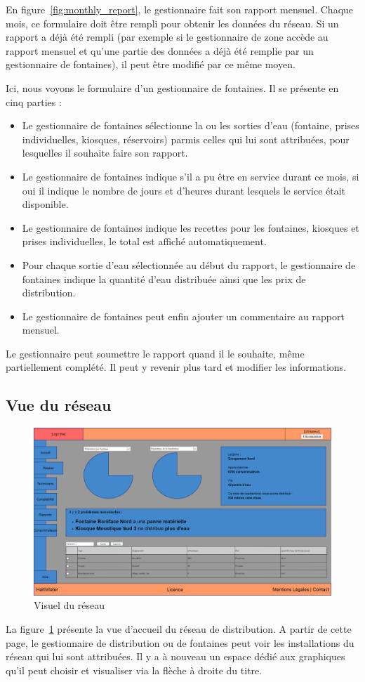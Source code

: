 \documentclass[a4paper, 11pt]{article}
\begin{document}
    En figure~\ref{fig:monthly_report}, le gestionnaire fait son rapport mensuel. Chaque mois, ce formulaire doit être rempli pour obtenir les données du réseau. Si un rapport a déjà été rempli (par exemple si le gestionnaire de zone accède au rapport mensuel et qu'une partie des données a déjà été remplie par un gestionnaire de fontaines), il peut être modifié par ce même moyen.

    Ici, nous voyons le formulaire d'un gestionnaire de fontaines. Il se présente en cinq parties :
    \begin{itemize}
      \item Le gestionnaire de fontaines sélectionne la ou les sorties d'eau (fontaine, prises individuelles, kiosques, réservoirs) parmis celles qui lui sont attribuées, pour lesquelles il souhaite faire son rapport.
      \item Le gestionnaire de fontaines indique s'il a pu être en service durant ce mois, si oui il indique le nombre de jours et d'heures durant lesquels le service était disponible.
      \item Le gestionnaire de fontaines indique les recettes pour les fontaines, kiosques et prises individuelles, le total est affiché automatiquement.
      \item Pour chaque sortie d'eau sélectionnée au début du rapport, le gestionnaire de fontaines indique la quantité d'eau distribuée ainsi que les prix de distribution.
      \item Le gestionnaire de fontaines peut enfin ajouter un commentaire au rapport mensuel.
    \end{itemize}

    Le gestionnaire peut soumettre le rapport quand il le souhaite, même partiellement complété. Il peut y revenir plus tard et modifier les informations.

  \subsection{Vue du réseau}
    \begin{figure}[H]
        \centering
        \includegraphics[width=.8\textwidth]{Cahier_des_Charges/reseau}
        \caption{Visuel du réseau}
        \label{fig:network}
    \end{figure}
    La figure~\ref{fig:network} présente la vue d'accueil du réseau de distribution. A partir de cette page, le gestionnaire de distribution ou de fontaines peut voir les installations du réseau qui lui sont attribuées. Il y a à nouveau un espace dédié aux graphiques qu'il peut choisir et visualiser via la flèche à droite du titre.
\end{document}

